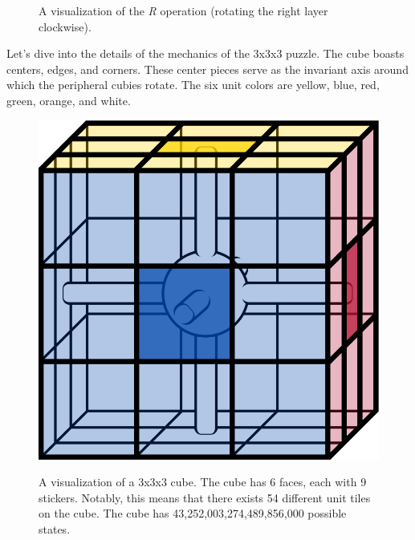\documentclass[12pt]{article}
\begin{document}
\begin{figure}[h]
\begin{minipage}[c]{0.2\textwidth}
    \end{minipage}
    \caption{A visualization of the \textit{R} operation (rotating the right layer clockwise).}
\end{figure}

Let's dive into the details of the mechanics of the 3x3x3 puzzle. The cube boasts centers, edges, and corners. These center pieces serve as the invariant axis around which the peripheral cubies rotate. The six unit colors are yellow, blue, red, green, orange, and white.

\begin{figure}[h]
    \hfill 
    \begin{minipage}[c]{0.2\textwidth} 
        \centering
        \includegraphics[scale=0.1]{core.png}
    \end{minipage}
    \hfill 
    \begin{minipage}[c]{0.59\textwidth} 
        \vspace*{\fill} 
        A visualization of a 3x3x3 cube. The cube has 6 faces, each with 9 stickers. Notably, this means that there exists 54 different unit tiles on the cube. The cube has 43,252,003,274,489,856,000 possible states.\footnotemark
        \vspace*{\fill}
    \end{minipage}
    \hfill 
\end{figure}
\end{document}
